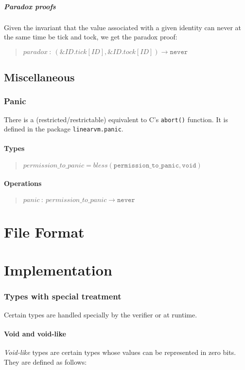 \documentclass[a4paper]{book}
\newcommand\TypeDefinition[1]{\begin{quote}$\mathit{#1}$\end{quote}}
\newcommand\FuncSignature[2]{\begin{quote}$\mathit{#1}\ :\ \mathit{#2}$\end{quote}}
\begin{document}
\subsubsection*{Paradox proofs}
Given the invariant that the value associated with a given identity
can never at the same time be tick and tock, we get the paradox proof:
\FuncSignature{paradox}{(\&ID.tick[ID], \&ID.tock[ID]) \to \texttt{never}}

\chapter{Miscellaneous}

\section{Panic}

There is a (restricted/restrictable) equivalent to C's \texttt{abort()} function.
It is defined in the package \texttt{linearvm.panic}.

\subsection*{Types}
\TypeDefinition{permission\_to\_panic = bless(\texttt{permission\_to\_panic}, \texttt{void})}

\subsection*{Operations}
\FuncSignature{panic}{permission\_to\_panic \to \texttt{never}}


\part{File Format}

\part{Implementation}

\section{Types with special treatment}

Certain types are handled specially by the verifier or at runtime.

\subsection{Void and void-like}
\emph{Void-like} types are certain types whose values can be
represented in zero bits.
They are defined as follows:
\end{document}
